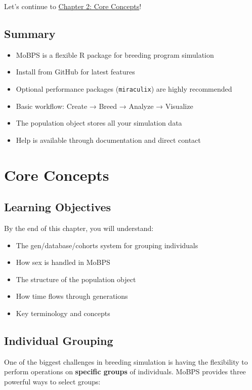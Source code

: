 \documentclass[
  letterpaper,
]{book}
\providecommand{\tightlist}{%
  \setlength{\itemsep}{0pt}\setlength{\parskip}{0pt}}
\begin{document}
Let's continue to \href{02-core-concepts.qmd}{Chapter 2: Core Concepts}!

\section{Summary}\label{summary}

\begin{itemize}
\tightlist
\item
  MoBPS is a flexible R package for breeding program simulation
\item
  Install from GitHub for latest features
\item
  Optional performance packages (\texttt{miraculix}) are highly
  recommended
\item
  Basic workflow: Create → Breed → Analyze → Visualize
\item
  The population object stores all your simulation data
\item
  Help is available through documentation and direct contact
\end{itemize}

\chapter{Core Concepts}\label{sec-core-concepts}

\section{Learning Objectives}\label{learning-objectives-1}

By the end of this chapter, you will understand:

\begin{itemize}
\tightlist
\item
  The gen/database/cohorts system for grouping individuals
\item
  How sex is handled in MoBPS
\item
  The structure of the population object
\item
  How time flows through generations
\item
  Key terminology and concepts
\end{itemize}

\section{Individual Grouping}\label{sec-grouping}

One of the biggest challenges in breeding simulation is having the
flexibility to perform operations on \textbf{specific groups} of
individuals. MoBPS provides three powerful ways to select groups:
\end{document}
